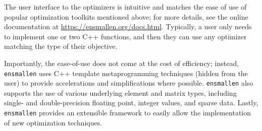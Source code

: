 \documentclass[twoside,11pt]{article}
\begin{document}
%
%
%

The user interface to the optimizers is intuitive
and matches the ease of use of popular
optimization toolkits mentioned above; for more details, see
the online documentation at
\mbox{\url{https://ensmallen.org/docs.html}}.
Typically, a user only needs to implement one or two {C++}
functions, and then they can use any optimizer
matching the type of their objective.

Importantly, the ease-of-use does not come at the cost of efficiency; instead,
{\tt ensmallen} uses C++ template metaprogramming techniques (hidden from the
user) to provide accelerations and simplifications where possible.
{\tt ensmallen} also supports the use of various underlying element and matrix
types, including single- and double-precision floating point,
integer values, and sparse data.
Lastly, {\tt ensmallen} provides an extensible framework to easily allow the implementation of new optimization techniques.
\end{document}
